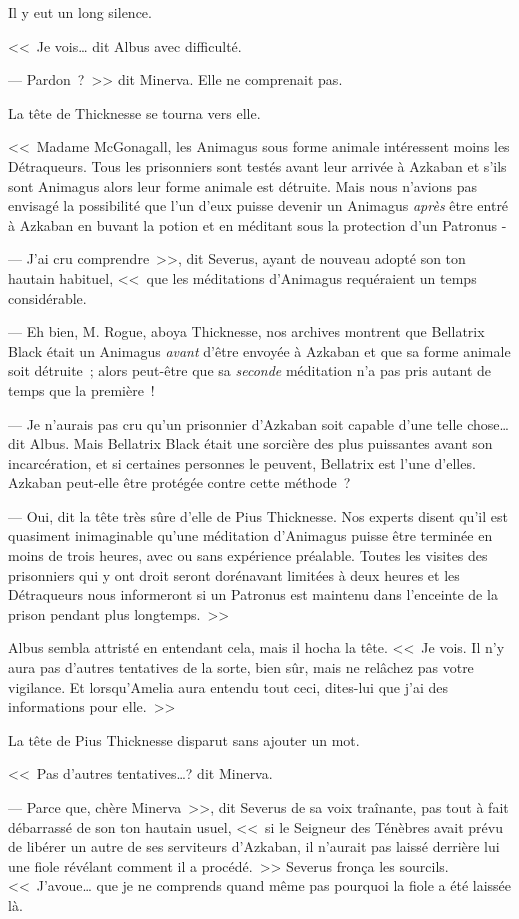 Il y eut un long silence.

<<~Je vois… dit Albus avec difficulté.

--- Pardon~?~>> dit Minerva. Elle ne comprenait pas.

La tête de Thicknesse se tourna vers elle.

<<~Madame McGonagall, les Animagus sous forme animale intéressent moins les Détraqueurs. Tous les prisonniers sont testés avant leur arrivée à Azkaban et s'ils sont Animagus alors leur forme animale est détruite. Mais nous n'avions pas envisagé la possibilité que l'un d'eux puisse devenir un Animagus \emph{après} être entré à Azkaban en buvant la potion et en méditant sous la protection d'un Patronus -

--- J'ai cru comprendre~>>, dit Severus, ayant de nouveau adopté son ton hautain habituel, <<~que les méditations d'Animagus requéraient un temps considérable.

--- Eh bien, M. Rogue, aboya Thicknesse, nos archives montrent que Bellatrix Black était un Animagus \emph{avant} d'être envoyée à Azkaban et que sa forme animale soit détruite~; alors peut-être que sa \emph{seconde} méditation n'a pas pris autant de temps que la première~!

--- Je n'aurais pas cru qu'un prisonnier d'Azkaban soit capable d'une telle chose… dit Albus. Mais Bellatrix Black était une sorcière des plus puissantes avant son incarcération, et si certaines personnes le peuvent, Bellatrix est l'une d'elles. Azkaban peut-elle être protégée contre cette méthode~?

--- Oui, dit la tête très sûre d'elle de Pius Thicknesse. Nos experts disent qu'il est quasiment inimaginable qu'une méditation d'Animagus puisse être terminée en moins de trois heures, avec ou sans expérience préalable. Toutes les visites des prisonniers qui y ont droit seront dorénavant limitées à deux heures et les Détraqueurs nous informeront si un Patronus est maintenu dans l'enceinte de la prison pendant plus longtemps.~>>

Albus sembla attristé en entendant cela, mais il hocha la tête. <<~Je vois. Il n'y aura pas d'autres tentatives de la sorte, bien sûr, mais ne relâchez pas votre vigilance. Et lorsqu'Amelia aura entendu tout ceci, dites-lui que j'ai des informations pour elle.~>>

La tête de Pius Thicknesse disparut sans ajouter un mot.

<<~Pas d'autres tentatives…? dit Minerva.

--- Parce que, chère Minerva~>>, dit Severus de sa voix traînante, pas tout à fait débarrassé de son ton hautain usuel, <<~si le Seigneur des Ténèbres avait prévu de libérer un autre de ses serviteurs d'Azkaban, il n'aurait pas laissé derrière lui une fiole révélant comment il a procédé.~>> Severus fronça les sourcils. <<~J'avoue… que je ne comprends quand même pas pourquoi la fiole a été laissée là.

